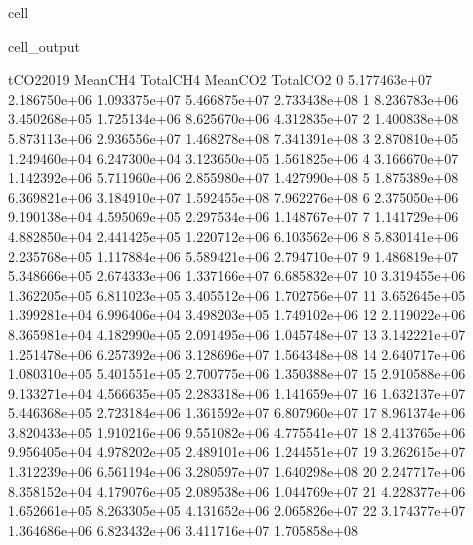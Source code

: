 \documentclass[letterpaper,10pt,english]{jupyterBook}
\begin{document}
\begin{sphinxuseclass}{cell}
\begin{sphinxVerbatimOutput}
\begin{sphinxuseclass}{cell_output}
\begin{sphinxVerbatim}[commandchars=\\\{\}]
       tCO2\PYGZus{}2019      Mean\PYGZus{}CH4     Total\PYGZus{}CH4      Mean\PYGZus{}CO2     Total\PYGZus{}CO2  
0   5.177463e+07  2.186750e+06  1.093375e+07  5.466875e+07  2.733438e+08  
1   8.236783e+06  3.450268e+05  1.725134e+06  8.625670e+06  4.312835e+07  
2   1.400838e+08  5.873113e+06  2.936556e+07  1.468278e+08  7.341391e+08  
3   2.870810e+05  1.249460e+04  6.247300e+04  3.123650e+05  1.561825e+06  
4   3.166670e+07  1.142392e+06  5.711960e+06  2.855980e+07  1.427990e+08  
5   1.875389e+08  6.369821e+06  3.184910e+07  1.592455e+08  7.962276e+08  
6   2.375050e+06  9.190138e+04  4.595069e+05  2.297534e+06  1.148767e+07  
7   1.141729e+06  4.882850e+04  2.441425e+05  1.220712e+06  6.103562e+06  
8   5.830141e+06  2.235768e+05  1.117884e+06  5.589421e+06  2.794710e+07  
9   1.486819e+07  5.348666e+05  2.674333e+06  1.337166e+07  6.685832e+07  
10  3.319455e+06  1.362205e+05  6.811023e+05  3.405512e+06  1.702756e+07  
11  3.652645e+05  1.399281e+04  6.996406e+04  3.498203e+05  1.749102e+06  
12  2.119022e+06  8.365981e+04  4.182990e+05  2.091495e+06  1.045748e+07  
13  3.142221e+07  1.251478e+06  6.257392e+06  3.128696e+07  1.564348e+08  
14  2.640717e+06  1.080310e+05  5.401551e+05  2.700775e+06  1.350388e+07  
15  2.910588e+06  9.133271e+04  4.566635e+05  2.283318e+06  1.141659e+07  
16  1.632137e+07  5.446368e+05  2.723184e+06  1.361592e+07  6.807960e+07  
17  8.961374e+06  3.820433e+05  1.910216e+06  9.551082e+06  4.775541e+07  
18  2.413765e+06  9.956405e+04  4.978202e+05  2.489101e+06  1.244551e+07  
19  3.262615e+07  1.312239e+06  6.561194e+06  3.280597e+07  1.640298e+08  
20  2.247717e+06  8.358152e+04  4.179076e+05  2.089538e+06  1.044769e+07  
21  4.228377e+06  1.652661e+05  8.263305e+05  4.131652e+06  2.065826e+07  
22  3.174377e+07  1.364686e+06  6.823432e+06  3.411716e+07  1.705858e+08  
\end{sphinxVerbatim}

\end{sphinxuseclass}\end{sphinxVerbatimOutput}

\end{sphinxuseclass}
\end{document}
